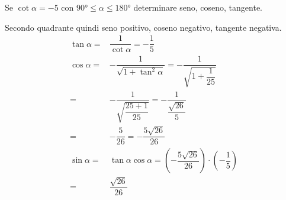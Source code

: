 Se $\cot\alpha=-5$ con $\ang{90}\leq\alpha\leq\ang{180}$ determinare seno, coseno, tangente.

Secondo quadrante quindi seno positivo, coseno negativo, tangente negativa.
\begin{align*}
\tan\alpha=&\dfrac{1}{\cot\alpha}=-\dfrac{1}{5}\\
\cos\alpha=&-\dfrac{1}{\sqrt{1+\tan^2\alpha}}=-\dfrac{1}{\sqrt{1+\dfrac{1}{25}}}\\
=&-\dfrac{1}{\sqrt{\dfrac{25+1}{25}}}=-\dfrac{1}{\dfrac{\sqrt{26}}{5}}\\
=&-\dfrac{5}{26}=-\dfrac{5\sqrt{26}}{26}\\
\sin\alpha=&\tan\alpha\cos\alpha=\left(-\dfrac{5\sqrt{26}}{26}\right)\cdot\left(-\dfrac{1}{5}\right)\\
=&\dfrac{\sqrt{26}}{26}
\end{align*}
